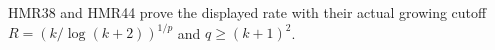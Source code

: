HMR38 and HMR44 prove the displayed rate with their actual
growing cutoff $R=(k/\log(k+2))^{1/p}$ and $q\geq(k+1)^2$.